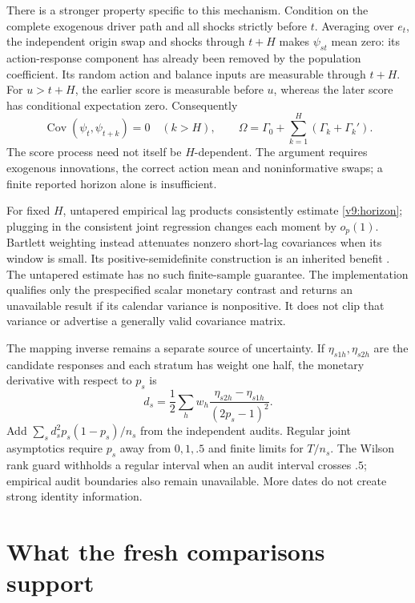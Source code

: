 There is a stronger property specific to this mechanism. Condition on the
complete exogenous driver path and all shocks strictly before $t$. Averaging
over $e_t$, the independent origin swap and shocks through $t+H$ makes
$\psi_{st}$ mean zero: its action-response component has already been removed
by the population coefficient. Its random action and balance inputs are
measurable through $t+H$. For $u>t+H$, the earlier score is measurable before
$u$, whereas the later score has conditional expectation zero. Consequently
\begin{equation}
 \operatorname{Cov}(\psi_t,\psi_{t+k})=0\quad(k>H),\qquad
 \Omega=\Gamma_0+\sum_{k=1}^{H}(\Gamma_k+\Gamma_k'). \label{v9:horizon}
\end{equation}
The score process need not itself be $H$-dependent. The argument requires
exogenous innovations, the correct action mean and noninformative swaps;
a finite reported horizon alone is insufficient.

For fixed $H$, untapered empirical lag products consistently estimate
\eqref{v9:horizon}; plugging in the consistent joint regression changes each
moment by $o_p(1)$. Bartlett weighting instead attenuates nonzero short-lag
covariances when its window is small. Its positive-semidefinite construction
is an inherited benefit \citep[printed p.4, Theorem 1]{newey1986}. The
untapered estimate has no such finite-sample guarantee. The implementation
qualifies only the prespecified scalar monetary contrast and returns an
unavailable result if its calendar variance is nonpositive. It does not clip
that variance or advertise a generally valid covariance matrix.

The mapping inverse remains a separate source of uncertainty. If
$\eta_{s1h},\eta_{s2h}$ are the candidate responses and each stratum has weight
one half, the monetary derivative with respect to $p_s$ is
\[
 d_s=\frac{1}{2}\sum_h w_h
       \frac{\eta_{s2h}-\eta_{s1h}}{(2p_s-1)^2}.
\]
Add $\sum_s d_s^2p_s(1-p_s)/n_s$ from the independent audits. Regular joint
asymptotics require $p_s$ away from $0,1,.5$ and finite limits for $T/n_s$.
The Wilson rank guard withholds a regular interval when an audit interval
crosses $.5$; empirical audit boundaries also remain unavailable. More dates
do not create strong identity information.

\section{What the fresh comparisons support}
\label{v9:results}

